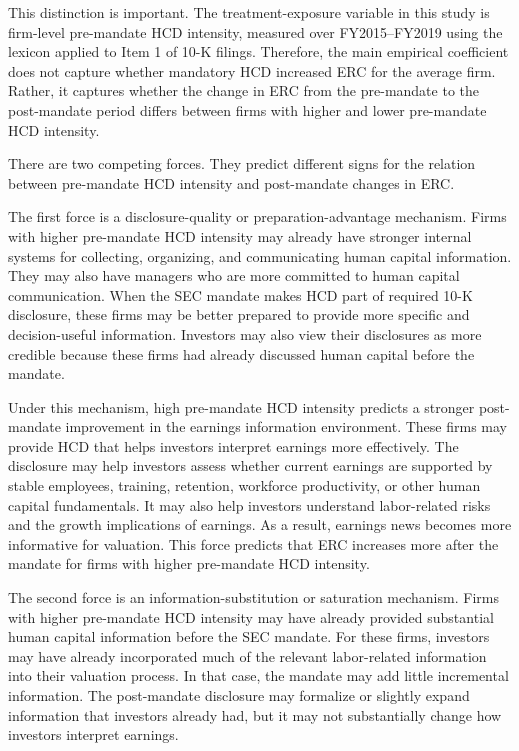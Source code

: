 \documentclass[12pt]{article}
\begin{document}
This distinction is important. The treatment-exposure variable in this study is firm-level pre-mandate HCD intensity, measured over FY2015--FY2019 using the \citet{demers_al2024} lexicon applied to Item 1 of 10-K filings. Therefore, the main empirical coefficient does not capture whether mandatory HCD increased ERC for the average firm. Rather, it captures whether the change in ERC from the pre-mandate to the post-mandate period differs between firms with higher and lower pre-mandate HCD intensity.

There are two competing forces. They predict different signs for the relation between pre-mandate HCD intensity and post-mandate changes in ERC.

The first force is a disclosure-quality or preparation-advantage mechanism. Firms with higher pre-mandate HCD intensity may already have stronger internal systems for collecting, organizing, and communicating human capital information. They may also have managers who are more committed to human capital communication. When the SEC mandate makes HCD part of required 10-K disclosure, these firms may be better prepared to provide more specific and decision-useful information. Investors may also view their disclosures as more credible because these firms had already discussed human capital before the mandate.

Under this mechanism, high pre-mandate HCD intensity predicts a stronger post-mandate improvement in the earnings information environment. These firms may provide HCD that helps investors interpret earnings more effectively. The disclosure may help investors assess whether current earnings are supported by stable employees, training, retention, workforce productivity, or other human capital fundamentals. It may also help investors understand labor-related risks and the growth implications of earnings. As a result, earnings news becomes more informative for valuation. This force predicts that ERC increases more after the mandate for firms with higher pre-mandate HCD intensity.

The second force is an information-substitution or saturation mechanism. Firms with higher pre-mandate HCD intensity may have already provided substantial human capital information before the SEC mandate. For these firms, investors may have already incorporated much of the relevant labor-related information into their valuation process. In that case, the mandate may add little incremental information. The post-mandate disclosure may formalize or slightly expand information that investors already had, but it may not substantially change how investors interpret earnings.
\end{document}
